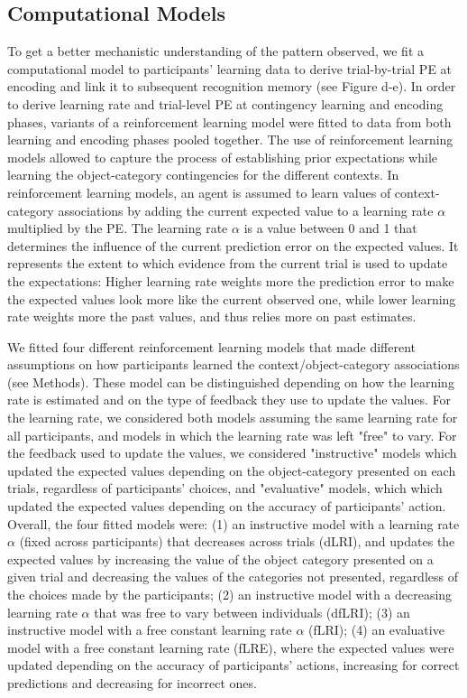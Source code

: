 \documentclass[a4paper,12pt]{article}
\begin{document}
\subsection{Computational Models}
To get a better mechanistic understanding of the pattern observed, we fit a computational model to participants' learning data to derive trial-by-trial PE at encoding and link it to subsequent recognition memory (see Figure \label{fig:Methods}d-e). 
In order to derive learning rate and trial-level PE at contingency learning and encoding phases, variants of a reinforcement learning model \citep{Sutton2018a} were fitted to data from both learning and encoding phases pooled together. The use of reinforcement learning models allowed to capture the process of establishing prior expectations while learning the object-category contingencies for the different contexts. In reinforcement learning models, an agent is assumed to learn values of context-category associations by adding the current expected value to a learning rate $\alpha$ multiplied by the PE. The learning rate $\alpha$ is a value between 0 and 1 that determines the influence of the current prediction error on the expected values. It represents the extent to which evidence from the current trial is used to update the expectations: Higher learning rate weights more the prediction error to make the expected values look more like the current observed one, while lower learning rate weights more the past values, and thus relies more on past estimates.  \par
We fitted four different reinforcement learning models that made different assumptions on how participants learned the context/object-category associations (see Methods). These model can be distinguished depending on how the learning rate is estimated and on the type of feedback they use to update the values. For the learning rate, we considered both models assuming the same learning rate for all participants, and models in which the learning rate was left "free" to vary. For the feedback used to update the values, we considered "instructive" models which updated the expected values depending on the object-category presented on each trials, regardless of participants' choices, and "evaluative" models, which which updated the expected values depending on the accuracy of participants' action. Overall, the four fitted models were: (1) an instructive model with a learning rate $\alpha$ (fixed across participants) that decreases across trials (dLRI), and updates the expected values by increasing the value of the object category presented on a given trial and decreasing the values of the categories not presented, regardless of the choices made by the participants; (2) an instructive model with a decreasing learning rate $\alpha$ that was free to vary between individuals (dfLRI); (3) an instructive model with a free constant learning rate $\alpha$ (fLRI); (4) an evaluative model with a free constant learning rate (fLRE), where the expected values were updated depending on the accuracy of participants' actions, increasing for correct predictions and decreasing for incorrect ones. \par
\end{document}
